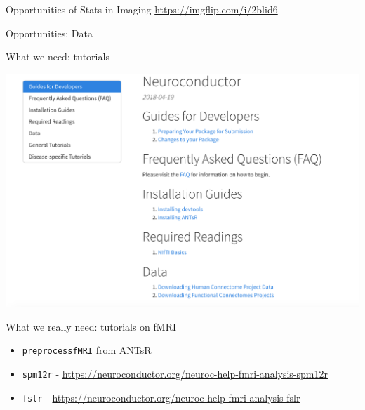 \documentclass[ignorenonframetext,]{beamer}
\providecommand{\tightlist}{%
  \setlength{\itemsep}{0pt}\setlength{\parskip}{0pt}}
\begin{document}
\begin{frame}[fragile]
\begin{block}{Opportunities of Stats in Imaging}
\url{https://imgflip.com/i/2blid6}

\end{block}

\begin{block}{Opportunities: Data}

\end{block}

\begin{block}{What we need: tutorials}

\includegraphics[width=0.95\linewidth]{figure/tutorials}

\end{block}

\begin{block}{What we really need: tutorials on fMRI}

\begin{itemize}
\tightlist
\item
  \texttt{preprocessfMRI} from ANTsR
\item
  \texttt{spm12r} -
  \url{https://neuroconductor.org/neuroc-help-fmri-analysis-spm12r}
\item
  \texttt{fslr} -
  \url{https://neuroconductor.org/neuroc-help-fmri-analysis-fslr}
\end{itemize}

\end{block}

\end{frame}
\end{document}
